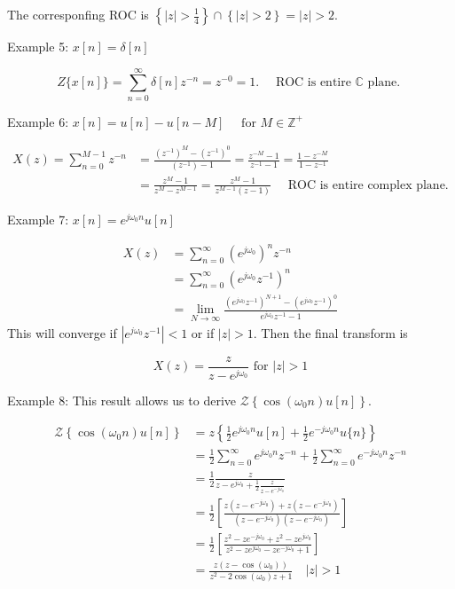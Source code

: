 \documentclass{article}
\begin{document}
The corresponfing ROC is $\left\{|z|>\frac{1}{4}\right\} \cap \left\{|z|> 2\right\} = |z| > 2$.

Example 5: $x[n]=\delta[n]$

$$
Z\{x[n]\}=\sum_{n=0}^{\infty} \delta[n] z^{-n}=z^{-0}=1 . \quad \text { ROC is entire } \mathbb{C} \text { plane. }
$$


Example 6: $x[n]=u[n]-u[n-M] \quad\text{ for } M \in \mathbb{Z}^{+}$

$$
\begin{aligned}
X(z)=\sum_{n=0}^{M-1} z^{-n} & =\frac{\left(z^{-1}\right)^{M}-\left(z^{-1}\right)^{0}}{\left(z^{-1}\right)-1}=\frac{z^{-M}-1}{z^{-1}-1}=\frac{1-z^{-M}}{1-z^{-1}} \\
& =\frac{z^{M}-1}{z^{M}-z^{M-1}}=\frac{z^{M}-1}{z^{M-1}(z-1)} \quad \text { ROC is entire complex plane.}
\end{aligned}
$$

Example 7: $x[n]=e^{j \omega_0 n} u[n]$

$$
\begin{aligned}
  X(z) & =\sum_{n=0}^{\infty}\left(e^{j \omega_0}\right)^{n} z^{-n}\\
  &= \sum_{n=0}^{\infty}\left(e^{j \omega_0} z^{-1}\right)^{n} \\
  & =\lim _{N \rightarrow \infty} \frac{\left(e^{j \omega_0} z^{-1}\right)^{N+1}-\left(e^{j \omega_0} z^{-1}\right)^{0}}{e^{j \omega_0} z^{-1}-1}
\end{aligned}
$$
This will converge if $|e^{j\omega_0} z^{-1}| < 1$ or if $|z| > 1$. Then the final transform is

$$
X(z) = \frac{z}{z-e^{j\omega_0}} \text{ for } |z| > 1
$$

Example 8: This result allows us to derive $\mathcal{Z}\left\{\cos(\omega_0 n)u[n]\right\}$.

$$
\begin{aligned}
\mathcal{Z}\left\{\cos \left(\omega_0 n\right) u[n]\right\} &=z\left\{\frac{1}{2} e^{j \omega_0 n} u[n]+\frac{1}{2} e^{-j \omega_0 n} u\{n\}\right\} \\
& =\frac{1}{2} \sum_{n=0}^{\infty} e^{j \omega_0 n} z^{-n}+\frac{1}{2} \sum_{n=0}^{\infty} e^{-j \omega_0 n} z^{-n} \\
& =\frac{1}{2} \frac{z}{z-e^{j \omega_0}+\frac{1}{2} \frac{z}{z-e^{-j \omega_0}}} \\
& =\frac{1}{2}\left[\frac{z\left(z-e^{-j \omega_0}\right)+z\left(z-e^{-j \omega_0}\right)}{\left(z-e^{-j \omega_0}\right)\left(z-e^{-j \omega_0}\right)}\right] \\
& =\frac{1}{2}\left[\frac{z^{2}-z e^{-j \omega_0}+z^{2}-z e^{j \omega_0}}{z^{2}-z e^{j \omega_0}-z e^{-j \omega_0}+1}\right] \\
& =\frac{z\left(z-\cos \left(\omega_0\right)\right)}{z^{2}-2 \cos \left(\omega_0\right) z+1} \quad|z|>1
\end{aligned}
$$
\end{document}
